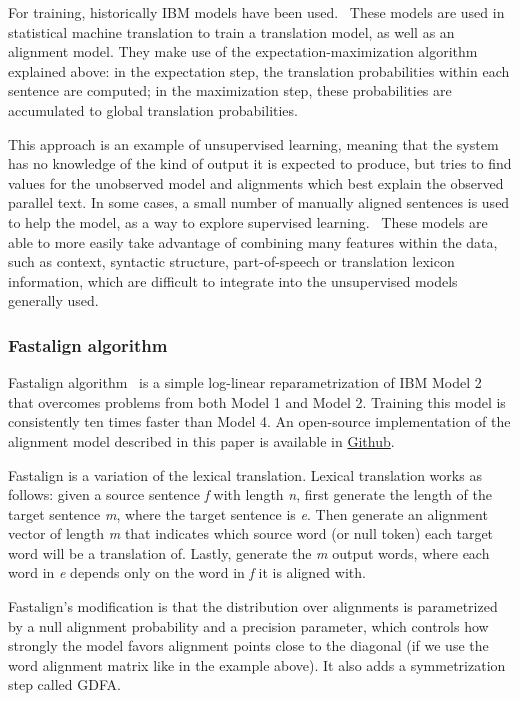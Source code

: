 For training, historically IBM models have been used.~\cite{koehn2009statistical} These models are used in statistical machine translation to train a translation model, as well as an alignment model. They make use of the expectation-maximization algorithm explained above: in the expectation step, the translation probabilities within each sentence are computed; in the maximization step, these probabilities are accumulated to global translation probabilities.

This approach is an example of unsupervised learning, meaning that the system has no knowledge of the kind of output it is expected to produce, but tries to find values for the unobserved model and alignments which best explain the observed parallel text. In some cases, a small number of manually aligned sentences is used to help the model, as a way to explore supervised learning.~\cite{varga2007parallel} These models are able to more easily take advantage of combining many features within the data, such as context, syntactic structure, part-of-speech or translation lexicon information, which are difficult to integrate into the unsupervised models generally used.

\subsubsection{Fastalign algorithm}

Fastalign algorithm~\cite{dyer-etal-2013-simple} is a simple log-linear reparametrization of IBM Model 2 that overcomes problems from both Model 1 and Model 2. Training this model is consistently ten times faster than Model 4. An open-source implementation of the alignment model described in this paper is available in \href{http://github.com/clab/fast align}{Github}.

Fastalign is a variation of the lexical translation. Lexical translation works as follows: given a source sentence \emph{f} with length \emph{n}, first generate the length of the target sentence \emph{m}, where the target sentence is \emph{e}. Then generate an alignment vector of length \emph{m} that indicates which source word (or null token) each target word will be a translation of. Lastly, generate the \emph{m} output words, where each word in \emph{e} depends only on the word in \emph{f} it is aligned with.

Fastalign's modification is that the distribution over alignments is parametrized by a null alignment probability and a precision parameter, which controls how strongly the model favors alignment points close to the diagonal (if we use the word alignment matrix like in the example above). It also adds a symmetrization step called GDFA.

